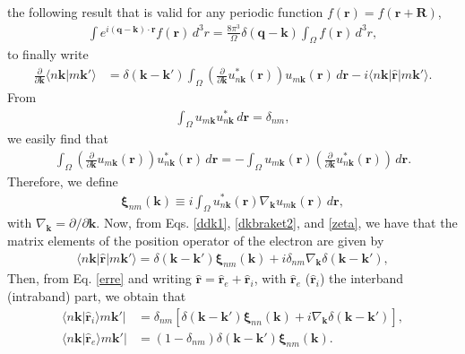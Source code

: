 the following result that is valid for any periodic function
$f(\mathbf{r}) = f(\mathbf{r} + \mathbf{R})$,
\begin{align}\label{periodic}
\int e^{i(\mathbf{q}-\mathbf{k})\cdot\mathbf{r}}f(\mathbf{r})\,d^{3}r =
\frac{8\pi^{3}}{\Omega}\delta(\mathbf{q} - \mathbf{k})
\int_{\Omega}f(\mathbf{r})\,d^{3}r,
\end{align}
to finally write \cite{blountSSP62}
\begin{align}\label{dkbraket3}
\frac{\partial}{\partial\mathbf{k}}
\langle n\mathbf{k}\vert m\mathbf{k}'\rangle
&= \delta(\mathbf{k}-\mathbf{k}')\int_{\Omega}
\left(
\frac{\partial}{\partial\mathbf{k}} u^{*}_{n\mathbf{k}}(\mathbf{r})
\right)
u_{m\mathbf{k}}(\mathbf{r})\,d\mathbf{r}
-i\langle n\mathbf{k}\vert\hat{\mathbf{r}}\vert m\mathbf{k}'\rangle.
\end{align}
From
\begin{align}\label{dnm1}
\int_{\Omega}u_{m\mathbf{k}} u^{*}_{n\mathbf{k}}\,d\mathbf{r} = \delta_{nm},
\end{align}
we easily find that
\begin{align}\label{dnm2}
\int_{\Omega}
\left(
\frac{\partial}{\partial\mathbf{k}} u_{m\mathbf{k}}(\mathbf{r})
\right)
u^{*}_{n\mathbf{k}}(\mathbf{r})\,d\mathbf{r}
= -\int_{\Omega}u_{m\mathbf{k}}(\mathbf{r})
\left(
\frac{\partial}{\partial\mathbf{k}} u^{*}_{n\mathbf{k}}(\mathbf{r})
\right)\,d\mathbf{r}.
\end{align}
Therefore, we define
\begin{align}\label{zeta}
\boldsymbol{\xi}_{nm}(\mathbf{k}) \equiv
i\int_{\Omega}u^{*}_{n\mathbf{k}}(\mathbf{r})\nabla_{\mathbf{k}}
u_{m\mathbf{k}}(\mathbf{r})\,d\mathbf{r},
\end{align} 
with $\nabla_{\mathbf{k}} = \partial/\partial\mathbf{k}$. Now, from Eqs.
\eqref{ddk1}, \eqref{dkbraket2}, and  \eqref{zeta}, we have that the matrix
elements of the position operator of the electron are given by
\begin{align}\label{erre}
\langle n\mathbf{k}\vert \hat{\mathbf{r}} \vert m\mathbf{k}'\rangle 
= \delta(\mathbf{k}-\mathbf{k}')\boldsymbol{\xi}_{nm}(\mathbf{k})
+ i\delta_{nm}\nabla_{\mathbf{k}}\delta(\mathbf{k}-\mathbf{k}'),
\end{align}
Then, from Eq. \eqref{erre} and writing $\hat{\mathbf{r}} = \hat{\mathbf{r}}_{e}
+ \hat{\mathbf{r}}_{i}$, with $\hat{\mathbf{r}}_{e}$ ($\hat{\mathbf{r}}_{i}$)
the interband (intraband) part, we obtain that
\begin{align}\label{rnmi}
\langle n\mathbf{k}\vert \hat{\mathbf{r}}_{i} \rangle m\mathbf{k}'\vert
&= \delta_{nm}
\left[
  \delta(\mathbf{k}-\mathbf{k}')\boldsymbol{\xi}_{nn}(\mathbf{k})
+ i\nabla_{\mathbf{k}}\delta(\mathbf{k} - \mathbf{k}')
\right],\\
\langle n\mathbf{k}\vert \hat{\mathbf{r}}_e \rangle m\mathbf{k}'\vert
&= (1 - \delta_{nm})\delta(\mathbf{k}-\mathbf{k}')
   \boldsymbol{\xi}_{nm}(\mathbf{k}).
\label{rnme}
\end{align} 

